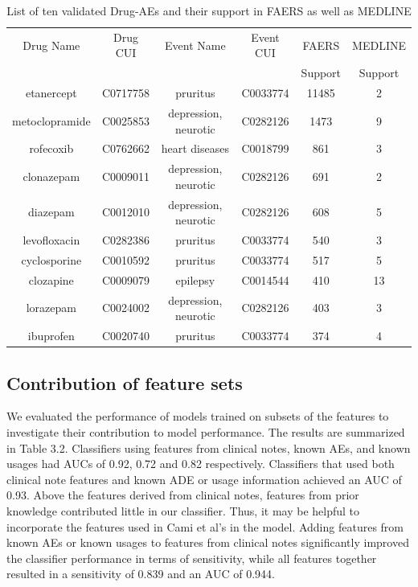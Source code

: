 \begin{table}
\begin{center}
\begin{tabular}{|c|c|c|c|c|c||}
  \hline Drug Name & Drug CUI & Event Name & Event CUI & FAERS &
  MEDLINE \\ & & & & Support & Support \\ \hline\hline etanercept &
  C0717758 & pruritus & C0033774 & 11485 & 2 \\ metoclopramide &
  C0025853 & depression, neurotic & C0282126 & 1473 & 9 \\ rofecoxib &
  C0762662 & heart diseases & C0018799 & 861 & 3 \\ clonazepam &
  C0009011 & depression, neurotic & C0282126 & 691 & 2 \\ diazepam &
  C0012010 & depression, neurotic & C0282126 & 608 & 5 \\ levofloxacin
  & C0282386 & pruritus & C0033774 & 540 & 3 \\ cyclosporine &
  C0010592 & pruritus & C0033774 & 517 & 5 \\ clozapine & C0009079 &
  epilepsy & C0014544 & 410 & 13 \\ lorazepam & C0024002 & depression,
  neurotic & C0282126 & 403 & 3 \\ ibuprofen & C0020740 & pruritus &
  C0033774 & 374 & 4 \\ \hline
\end{tabular}
\end{center}
\caption[Ten validated ADEs and their support in FAERS and
  MEDLINE]{List of ten validated Drug-AEs and their support in FAERS
  as well as MEDLINE}
\end{table}

\subsection{Contribution of feature sets}
We evaluated the performance of models trained on subsets of the
features to investigate their contribution to model performance.  The
results are summarized in Table 3.2.  Classifiers using features from
clinical notes, known AEs, and known usages had AUCs of 0.92, 0.72 and
0.82 respectively. Classifiers that used both clinical note features
and known ADE or usage information achieved an AUC of 0.93. Above the
features derived from clinical notes, features from prior knowledge
contributed little in our classifier. Thus, it may be helpful to
incorporate the features used in Cami et al’s in the model. Adding
features from known AEs or known usages to features from clinical
notes significantly improved the classifier performance in terms of
sensitivity, while all features together resulted in a sensitivity of
0.839 and an AUC of 0.944.

